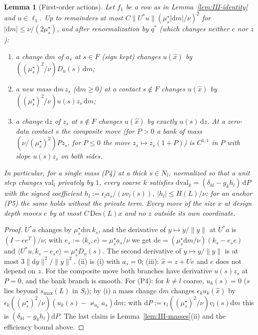 \documentclass[10pt]{amsart}
\newtheorem{lemma}[theorem]{Lemma}
\theoremstyle{definition}
\theoremstyle{remark}
\newcommand{\ip}[2]{\langle #1,#2\rangle}
\begin{document}
\begin{lemma}[First-order actions]\label{lem:III-actions}
Let $f_1$ be a row as in Lemma~\textup{\ref{lem:III-identity}} and $u\in\ell_1$.
Up to remainders at most $C\|U^*u\|(\mu^\star_s|\mathrm dm|/\nu)^2$ for
$|\mathrm dm|\le\nu/(2\mu^\star_s)$, and after renormalization by $q^*$ (which
changes neither $e$ nor $z$):
\begin{enumerate}
\item[(i)] a change $\mathrm dm$ of $a_s$ at $s\in F$ \textup{(}sign kept\textup{)}
changes $u(\hat x)$ by $((\mu^\star_s)^2/\nu)D_u(s)\,\mathrm dm$;
\item[(ii)] a new mass $\mathrm dm\,z_s$ ($\mathrm dm\ge0$) at a contact
$s\notin F$ changes $u(\hat x)$ by $((\mu^\star_s)^2/\nu)u(s)z_s\,\mathrm dm$;
\item[(iii)] a change $\mathrm dz$ of $z_s$ at $s\notin F$ changes $u(\hat x)$ by
exactly $u(s)\,\mathrm dz$.  At a zero-data contact $s$ the \emph{composite
move} \textup{(}for $P>0$ a bank of mass $(\nu/(\mu^\star_s)^2)Pz_s$, for
$P\le0$ the move $z_s\mapsto z_s(1+P)$\textup{)} is $C^{1,1}$ in $P$ with slope
$u(s)z_s$ on both sides.
\end{enumerate}
In particular, for a single mass \textup{(P4)} at a thick $s\in N_l$, normalized so
that a unit step changes $\mathrm{val}_l$ privately by $1$, every
coarse $k$ satisfies $\mathrm d\mathrm{val}_k=(\delta_{kl}-g_kh_l)
\,\mathrm dP$ with the signed coefficient $h_l:=\epsilon_la_s/(\nu v_l(s))$,
$|h_l|\le H(L)/\nu$; for an anchor \textup{(P5)} the same holds without the
private term.  Every move of the size $x$ at design depth moves $e$ by at most
$C\,\mathrm{Des}(L)x$ and no $z$ outside its own coordinate.
\end{lemma}

\begin{proof}
$U^*a$ changes by $\mu^\star_s\mathrm dm\,k_s$, and the derivative of
$y\mapsto y/\|y\|$ at $U^*a$ is $(I-ee^T)/\nu$; with $e_s:=\ip{k_s}{e}=
\mu^\star_sa_s/\nu$ we get $\mathrm de=(\mu^\star_s\mathrm dm/\nu)(k_s-e_se)$ and
$\ip{U^*u}{k_s-e_se}=\mu^\star_sD_u(s)$.  The second derivative of $y\mapsto
y/\|y\|$ is at most $3\|\mathrm dy\|^2/\|y\|^2$.  (ii) is (i) with $a_s=0$;
(iii): $\hat x=z+Ue$ and $e$ does not depend on $z$.  For the composite move both
branches have derivative $u(s)z_s$ at $P=0$, and the bank branch is smooth.
For (P4): for $k\ne l$ coarse, $u_k(s)=0$ ($s$ lies beyond $s_{\max}(L)$ in
$S_l$); by (i) a mass change $\mathrm dm$ changes $\epsilon_k u_k(\hat x)$ by
$\epsilon_k((\mu^\star_s)^2/\nu)(u_k(s)-\varkappa_{u_k}a_s)\mathrm dm$; with
$\mathrm dP:=\epsilon_l((\mu^\star_s)^2/\nu)v_l(s)\mathrm dm$ this is
$(\delta_{kl}-g_kh_l)\mathrm dP$.  The last claim is
Lemma~\ref{lem:III-masses}(ii) and the efficiency bound above.
\end{proof}
\end{document}
